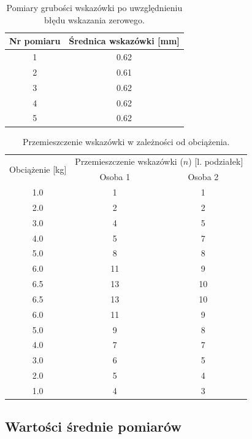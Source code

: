 \documentclass[a4paper,12pt]{article}
\begin{document}
\begin{table}[H]
    \centering
    \begin{tabular}{|c|c|}
        \hline
        Nr pomiaru & Średnica wskazówki [mm] \\
        \hline
        1 & 0.62 \\ \hline
        2 & 0.61 \\ \hline
        3 & 0.62 \\ \hline
        4 & 0.62 \\ \hline
        5 & 0.62 \\ \hline
    \end{tabular}
    \caption{Pomiary grubości wskazówki po uwzględnieniu błędu wskazania zerowego.}
    \label{tab:srednica_wskazowki}
\end{table}

\begin{table}[H]
    \centering
    \begin{tabular}{|c|c|c|}
        \hline
        \multirow{2}{*}{Obciążenie [kg]} & \multicolumn{2}{c|}{Przemieszczenie wskazówki ($n$) [l. podziałek]} \\
        \cline{2-3}
        & Osoba 1 & Osoba 2 \\
        \hline
        1.0 & 1  & 1  \\ \hline
        2.0 & 2  & 2  \\ \hline
        3.0 & 4  & 5  \\ \hline
        4.0 & 5  & 7  \\ \hline
        5.0 & 8  & 8  \\ \hline
        6.0 & 11 & 9  \\ \hline
        6.5 & 13 & 10 \\ \hline
        6.5 & 13 & 10 \\ \hline
        6.0 & 11 & 9  \\ \hline
        5.0 & 9  & 8  \\ \hline
        4.0 & 7  & 7  \\ \hline
        3.0 & 6  & 5  \\ \hline
        2.0 & 5  & 4  \\ \hline
        1.0 & 4  & 3  \\ \hline
    \end{tabular}
    \caption{Przemieszczenie wskazówki w zależności od obciążenia.}
    \label{tab:pozycja_wskazowki}
\end{table}

\subsection{Wartości średnie pomiarów}
\end{document}
